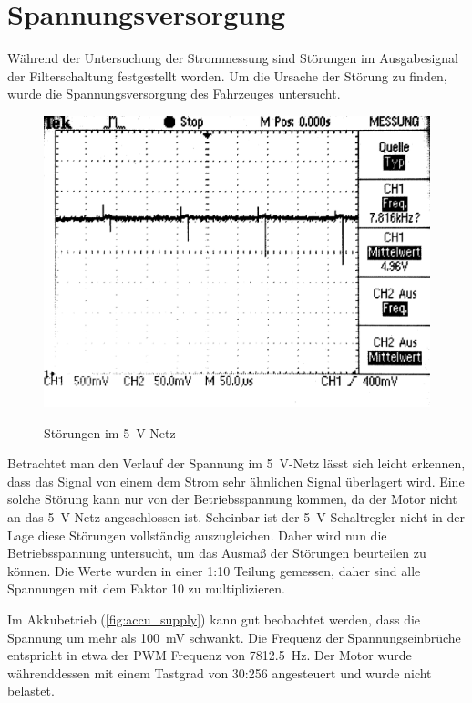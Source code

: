 \section{Spannungsversorgung}

Während der Untersuchung der Strommessung sind Störungen im Ausgabesignal der Filterschaltung festgestellt worden. Um die Ursache der Störung zu finden, wurde die Spannungsversorgung
des Fahrzeuges untersucht.

\begin{figure}[H]
\centering
\includegraphics[width=.8\textwidth]{5V_supply.png}\\
\caption{Störungen im \SI{5}{\V} Netz}%
\label{fig:5V_Supply}
\end{figure}

Betrachtet man den Verlauf der Spannung im \SI{5}{\V}-Netz lässt sich leicht erkennen, dass das Signal von einem dem Strom sehr ähnlichen Signal überlagert wird.
Eine solche Störung kann nur von der Betriebsspannung kommen, da der Motor nicht an das \SI{5}{\V}-Netz angeschlossen ist. Scheinbar ist der \SI{5}{\V}-Schaltregler nicht in der
Lage diese Störungen vollständig auszugleichen.
Daher wird nun die Betriebsspannung untersucht, um das Ausmaß der Störungen beurteilen zu können.
Die Werte wurden in einer 1:10 Teilung gemessen, daher sind alle Spannungen mit dem Faktor 10 zu multiplizieren.

Im Akkubetrieb (\cref{fig:accu_supply}) kann gut beobachtet werden, dass die Spannung um mehr als \SI{100}{\mV} schwankt. Die Frequenz der Spannungseinbrüche entspricht in etwa
der PWM Frequenz von \SI{7812,5}{\hertz}.  Der Motor wurde währenddessen mit einem Tastgrad von 30:256 angesteuert und wurde nicht belastet.


